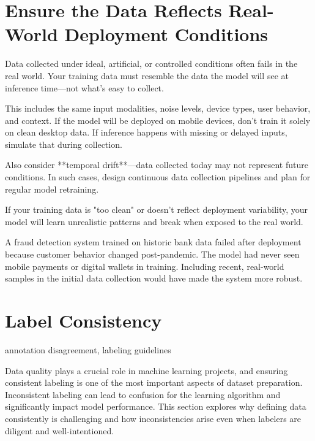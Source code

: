 \documentclass[12pt,openany]{book}
\begin{document}
\section{Ensure the Data Reflects Real-World Deployment Conditions}

Data collected under ideal, artificial, or controlled conditions often fails in the real world. Your training data must resemble the data the model will see at inference time—not what’s easy to collect.

This includes the same input modalities, noise levels, device types, user behavior, and context. If the model will be deployed on mobile devices, don’t train it solely on clean desktop data. If inference happens with missing or delayed inputs, simulate that during collection.

Also consider **temporal drift**—data collected today may not represent future conditions. In such cases, design continuous data collection pipelines and plan for regular model retraining.

If your training data is "too clean" or doesn't reflect deployment variability, your model will learn unrealistic patterns and break when exposed to the real world.

\begin{examplebox}
A fraud detection system trained on historic bank data failed after deployment because customer behavior changed post-pandemic. The model had never seen mobile payments or digital wallets in training. Including recent, real-world samples in the initial data collection would have made the system more robust.
\end{examplebox}



\section{Label Consistency}

\begin{keywordsbox}
annotation disagreement, labeling guidelines
\end{keywordsbox}

Data quality plays a crucial role in machine learning projects, and ensuring consistent labeling is one of the most important aspects of dataset preparation. Inconsistent labeling can lead to confusion for the learning algorithm and significantly impact model performance. This section explores why defining data consistently is challenging and how inconsistencies arise even when labelers are diligent and well-intentioned. \newline
\end{document}
